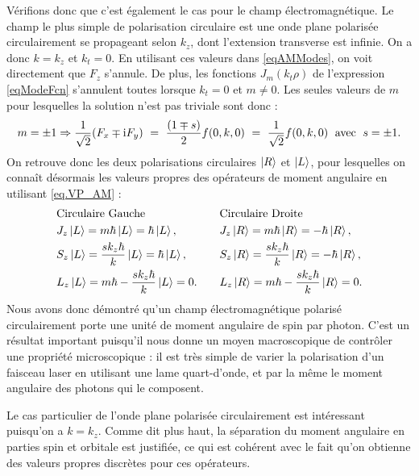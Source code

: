 Vérifions donc que c'est également le cas pour le champ électromagnétique. Le champ le plus simple de polarisation circulaire est une onde plane polarisée circulairement se propageant selon $k_z$, dont l'extension transverse est infinie. On a donc $k = k_z$ et $k_t = 0$. En utilisant ces valeurs dans \ref{eqAMModes}, on voit directement que $F_z$ s'annule. De plus, les fonctions $J_m(k_t\rho)$ de l'expression \ref{eqModeFcn} s'annulent toutes lorsque $k_t = 0$ et $m\neq 0$. Les seules valeurs de $m$ pour lesquelles la solution n'est pas triviale sont donc :
\begin{equation*}
m=\pm 1 \Rightarrow \frac{1}{\sqrt{2}}(F_x\mp\mathrm{i} F_y) ~= ~\frac{(1\mp s)}{2}f(0,k,0) ~=~ \frac{1}{\sqrt{2}}f(0,k,0) \;\mbox{ avec }\; s=\pm 1.
\end{equation*}
On retrouve donc les deux polarisations circulaires $\ket{R}$ et $\ket{L}$, pour lesquelles on connaît désormais les valeurs propres des opérateurs de moment angulaire en utilisant \ref{eq.VP_AM} :
\begin{equation*}
\begin{aligned}[c]
&\text{Circulaire Gauche}\\
&J_z\ket{L} = m\hbar\ket{L} = \hbar\ket{L},\\
&S_z\ket{L} = \frac{sk_z\hbar}{k}\ket{L} = \hbar\ket{L},\\
&L_z\ket{L} = m\hbar-\frac{sk_z\hbar}{k}\ket{L} = 0.
\end{aligned}
\qquad
\begin{aligned}[c]
&\text{Circulaire Droite}\\
&J_z\ket{R} = m\hbar\ket{R} = -\hbar\ket{R},\\
&S_z\ket{R} = \frac{sk_z\hbar}{k}\ket{R} = -\hbar\ket{R},\\
&L_z\ket{R} = m\hbar-\frac{sk_z\hbar}{k}\ket{R} = 0.
\end{aligned}
\end{equation*}
Nous avons donc démontré qu'un champ électromagnétique polarisé circulairement porte une unité de moment angulaire de spin par photon. C'est un résultat important puisqu'il nous donne un moyen macroscopique de contrôler une propriété microscopique : il est très simple de varier la polarisation d'un faisceau laser en utilisant une lame quart-d'onde, et par la même le moment angulaire des photons qui le composent.

Le cas particulier de l'onde plane polarisée circulairement est intéressant puisqu'on a $k=k_z$. Comme dit plus haut, la séparation du moment angulaire en parties spin et orbitale est justifiée, ce qui est cohérent avec le fait qu'on obtienne des valeurs propres discrètes pour ces opérateurs.

